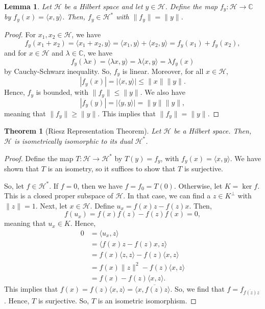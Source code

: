 \documentclass[a4paper, openany]{memoir}
\theoremstyle{definition}
\theoremstyle{plain}
\newtheorem{theorem}[definition]{Theorem}
\newtheorem{lemma}[definition]{Lemma}
\begin{document}
    \begin{lemma}
        Let $\mathcal{H}$ be a Hilbert space and let $y \in \mathcal{H}$. Define the map $f_y \colon \mathcal{H} \to \mathbb{C}$ by $f_y(x) = \langle x, y \rangle$. Then, $f_y \in \mathcal{H}^*$ with $\lVert f_y \rVert = \lVert y \rVert$.
    \end{lemma}
    \begin{proof}
        For $x_1, x_2 \in \mathcal{H}$, we have 
        \[f_y(x_1 + x_2) = \langle x_1 + x_2, y \rangle = \langle x_1, y \rangle + \langle x_2, y \rangle = f_y(x_1) + f_y(x_2),\]
        and for $x \in \mathcal{H}$ and $\lambda \in \mathbb{C}$, we have 
        \[f_y(\lambda x) = \langle \lambda x, y \rangle = \lambda \langle x, y \rangle = \lambda f_y(x)\]
        by Cauchy-Schwarz inequality. So, $f_y$ is linear. Moreover, for all $x \in \mathcal{H}$,
        \[|f_y(x)| = |\langle x, y \rangle| \leq \lVert x \rVert \lVert y \rVert.\]
        Hence, $f_y$ is bounded, with $\lVert f_y \rVert \leq \lVert y \rVert$. We also have
        \[|f_y(y)| = |\langle y, y \rangle| = \lVert y \rVert \lVert y \rVert,\]
        meaning that $\lVert f_y \rVert \geq \lVert y \rVert$. This implies that $\lVert f_y \rVert = \lVert y \rVert$.
    \end{proof}

    \begin{theorem}[Riesz Representation Theorem]
        Let $\mathcal{H}$ be a Hilbert space. Then, $\mathcal{H}$ is isometrically isomorphic to its dual $\mathcal{H}^*$.
    \end{theorem}
    \begin{proof}
        Define the map $T \colon \mathcal{H} \to \mathcal{H}^*$ by $T(y) = f_y$, with $f_y(x) = \langle x, y \rangle$. We have shown that $T$ is an isometry, so it suffices to show that $T$ is surjective.

        So, let $f \in \mathcal{H}^*$. If $f = 0$, then we have $f = f_0 = T(0)$. Otherwise, let $K = \ker f$. This is a closed proper subspace of $\mathcal{H}$. In that case, we can find a $z \in K^\perp$ with $\lVert z \rVert = 1$. Next, let $x \in \mathcal{H}$. Define $u_x = f(x)z - f(z)x$. Then,
        \[f(u_x) = f(x) f(z) - f(z)f(x) = 0,\]
        meaning that $u_x \in K$. Hence,
        \begin{align*}
            0 &= \langle u_x, z \rangle \\
            &= \langle f(x)z - f(z)x, z \rangle \\
            &= f(x) \langle z, z \rangle - f(z) \langle x, z \rangle \\
            &= f(x) \lVert z \rVert^2 - f(z) \langle x, z \rangle \\
            &= f(x) - f(z) \langle x, z \rangle.
        \end{align*}
        This implies that $f(x) = f(z) \langle x, z \rangle = \langle x, \overline{f(z)}z \rangle$. So, we find that $f = f_{\overline{f(z)}z}$. Hence, $T$ is surjective. So, $T$ is an isometric isomorphism.
    \end{proof}
\end{document}
